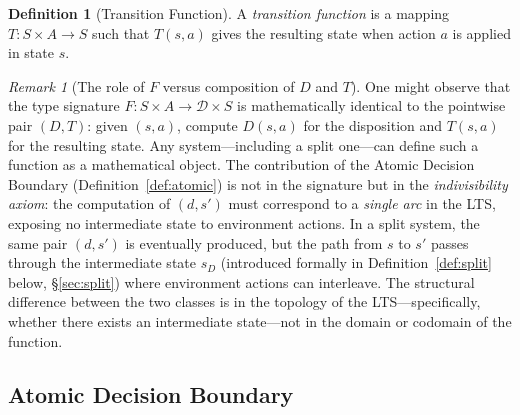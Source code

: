 \documentclass[11pt]{article}
\theoremstyle{plain}
\theoremstyle{definition}
\newtheorem{definition}[theorem]{Definition}
\theoremstyle{remark}
\newtheorem{remark}[theorem]{Remark}
\newcommand{\Dset}{\mathcal{D}}
\begin{document}
\begin{definition}[Transition Function]
\label{def:transfun}
A \emph{transition function} is a mapping
$T : S \times A \to S$
such that $T(s, a)$ gives the resulting state when action $a$ is applied in
state $s$.
\end{definition}

\begin{remark}[The role of $F$ versus composition of $D$ and $T$]
\label{rem:fvscomp}
One might observe that the type signature $F : S \times A \to \Dset \times S$
is mathematically identical to the pointwise pair $(D, T)$: given $(s, a)$,
compute $D(s,a)$ for the disposition and $T(s, a)$ for the resulting state.
Any system---including a split one---can define such a function as a
mathematical object.  The contribution of the Atomic Decision Boundary
(Definition~\ref{def:atomic}) is not in the signature but in the
\emph{indivisibility axiom}: the computation of $(d, s')$ must correspond to a
\emph{single arc} in the LTS, exposing no intermediate state to environment
actions.  In a split system, the same pair $(d, s')$ is eventually produced,
but the path from $s$ to $s'$ passes through the intermediate state $s_D$
(introduced formally in Definition~\ref{def:split} below, \S\ref{sec:split})
where environment actions can interleave.  The structural difference between
the two classes is in the topology of the LTS---specifically, whether there
exists an intermediate state---not in the domain or codomain of the function.
\end{remark}

\subsection{Atomic Decision Boundary}
\label{sec:atomic}
\end{document}
